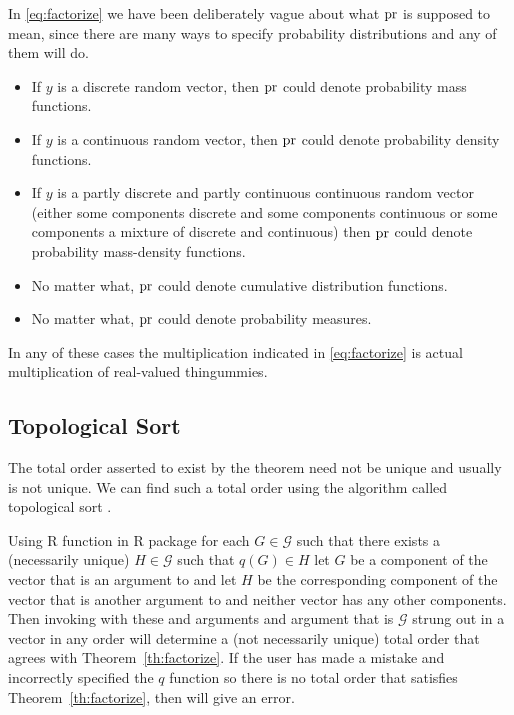 In \eqref{eq:factorize} we have been deliberately vague about what $\operatorname{pr}$ is
supposed to mean, since there are many ways to specify probability
distributions and any of them will do.
\begin{itemize}
\item If $y$ is a discrete random vector,
      then $\operatorname{pr}$ could denote probability mass functions.
\item If $y$ is a continuous random vector,
      then $\operatorname{pr}$ could denote probability density functions.
\item If $y$ is a partly discrete and partly continuous continuous
      random vector (either some components discrete and some components
      continuous or some components a mixture of discrete and continuous)
      then $\operatorname{pr}$ could denote probability mass-density functions.
\item No matter what, $\operatorname{pr}$ could denote cumulative distribution functions.
\item No matter what, $\operatorname{pr}$ could denote probability measures.
\end{itemize}
In any of these cases the multiplication indicated in \eqref{eq:factorize}
is actual multiplication of real-valued thingummies.

\subsection{Topological Sort}

The total order asserted to exist by the theorem need not be unique and
usually is not unique.
We can find such a total order using the algorithm called topological sort
\citep[Section~6.6]{aho-et-al}.

Using R function  in R package 
\citep{pooh-package}
for each $G \in \mathcal{G}$ such that there exists
a (necessarily unique) $H \in \mathcal{G}$ such that $q(G) \in H$
let $G$ be a component of the vector  that is an argument to
 and
let $H$ be the corresponding component of the vector  that is another
argument to  and
neither vector has any other components.  Then invoking  with
these  and  arguments and  argument that is
$\mathcal{G}$ strung out in a vector in any order
will determine a (not necessarily unique) total order that agrees with
Theorem~\ref{th:factorize}.  If the user has made a mistake and incorrectly
specified the $q$ function so there is no total order that satisfies
Theorem~\ref{th:factorize}, then  will give an error.

